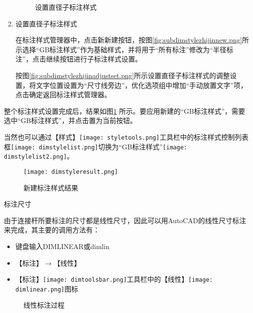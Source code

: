 \begin{procedure}
\begin{enumerate}
\begin{figure}[htbp]
\centering
{}\hspace{20pt}
\caption{设置直径子标注样式}
\end{figure}

\item 设置直径子标注样式

在标注样式管理器中，点击新新建按钮，按图\ref{fig:subdimstylezhijinnew.png}所示选择“GB标注样式”作为基础样式，并将用于“所有标注”修改为“半径标注”，点击继续按钮进行子标注样式设置。

按图\ref{fig:subdimstylezhijinadjustset.png}所示设置直径子标注样式的调整设置，将文字位置设置为“尺寸线旁边”，优化选项组中增加“手动放置文字”项，点击确定返回标注样式管理器。
\end{enumerate}

整个标注样式设置完成后，结果如图\ref{fig:dimstyleresult.png} 所示。要应用新建的“GB标注样式”，需要选中“GB标注样式”，并点击置为当前按钮。

当然也可以通过【样式】\texttt{[image: styletools.png]}工具栏中的标注样式控制列表框\texttt{[image: dimstylelist.png]}切换为“GB标注样式”\texttt{[image: dimstylelist2.png]}。

\begin{figure}[htbp]
\centering
\texttt{[image: dimstyleresult.png]}
\caption{新建标注样式结果}\label{fig:dimstyleresult.png}
\end{figure}
\item 标注尺寸

由于连接杆所要标注的尺寸都是线性尺寸，因此可以用AutoCAD的线性尺寸标注来完成，其主要的调用方法有：
\begin{itemize}
\item 键盘输入DIMLINEAR或dimlin
\item 【标注】$\rightarrow $【线性】
\item 【标注】\texttt{[image: dimtoolsbar.png]}工具栏中的【线性】\texttt{[image: dimlinear.png]}图标
\end{itemize}

\begin{figure}[htbp]
\centering
{}\hspace{10pt}
\hspace{10pt}
\hspace{10pt}
\caption{线性标注过程}
\end{figure}


\end{procedure}
